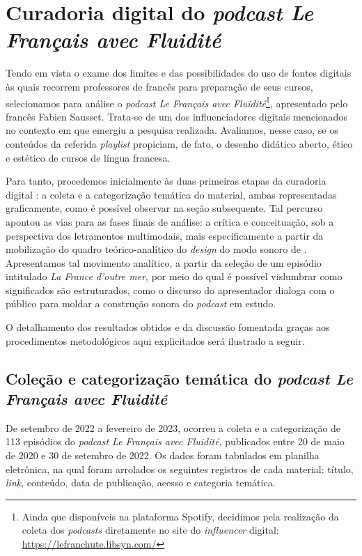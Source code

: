 \documentclass[portuguese]{textolivre}
\begin{document}
\section{Curadoria digital do \textit{podcast Le Français avec Fluidité}}\label{sec-normas}
Tendo em vista o exame dos limites e das possibilidades do uso de fontes digitais às quais recorrem professores de francês para preparação de seus cursos, selecionamos para análise o \textit{podcast Le Français avec Fluidité}\footnote{Ainda que disponíveis na plataforma Spotify, decidimos pela realização da coleta dos \textit{podcasts} diretamente no site do \textit{influencer} digital: \url{https://lefranchute.libsyn.com/}}, apresentado pelo francês Fabien Sausset. Trata-se de um dos influenciadores digitais mencionados no contexto em que emergiu a pesquisa realizada. Avaliamos, nesse caso, se os conteúdos da referida \textit{playlist} propiciam, de fato, o desenho didático aberto, ético e estético \cite{rocha_moocs_2019} de cursos de língua francesa.

Para tanto, procedemos inicialmente às duas primeiras etapas da curadoria digital \cite{deschaine_five_2015}: a coleta e a categorização temática do material, ambas representadas graficamente, como é possível observar na seção subsequente. Tal percurso apontou as vias para as fases finais de análise: a crítica e conceituação, sob a perspectiva dos letramentos multimodais, mais especificamente a partir da mobilização do quadro teórico-analítico do \textit{design} do modo sonoro de \textcite{kalantzis_letramentos_2020}. Apresentamos tal movimento analítico, a partir da seleção de um episódio intitulado \textit{La France d’outre mer}, por meio do qual é possível vislumbrar como significados são estruturados, como o discurso do apresentador dialoga com o público para moldar a construção sonora do \textit{podcast} em estudo.

O detalhamento dos resultados obtidos e da discussão fomentada graças aos procedimentos metodológicos aqui explicitados será ilustrado a seguir.


\subsection{Coleção e categorização temática do \textit{podcast Le Français avec Fluidité}}\label{sec-conduta}
De setembro de 2022 a fevereiro de 2023, ocorreu a coleta e a categorização de 113 episódios do \textit{podcast Le Français avec Fluidité}, publicados entre 20 de maio de 2020 e 30 de setembro de 2022. Os dados foram tabulados em planilha eletrônica, na qual foram arrolados os seguintes registros de cada material: título, \textit{link}, conteúdo, data de publicação, acesso e categoria temática. 
\end{document}
